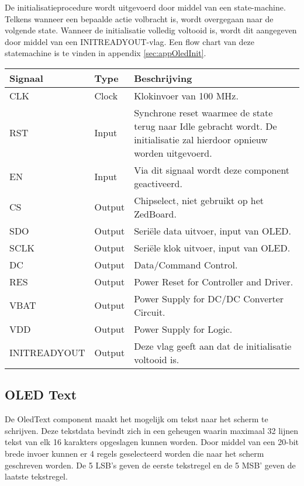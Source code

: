  		\par De initialisatieprocedure wordt uitgevoerd door middel van een state-machine. Telkens wanneer een bepaalde actie volbracht is, wordt overgegaan naar de volgende state. Wanneer de initialisatie volledig voltooid is, wordt dit aangegeven door middel van een INIT\textunderscore READY\textunderscore OUT-vlag.
 		Een flow chart van deze statemachine is te vinden in appendix \ref{sec:appOledInit}.

			\begin{table}[H]
				\begin{tabular}{p{} p{} p{}}
					\toprule
					\textbf{Signaal} & \textbf{Type} & \textbf{Beschrijving} \\
					\midrule
					CLK & Clock & Klokinvoer van 100 MHz. \\
					RST & Input & Synchrone reset waarmee de state terug naar Idle gebracht wordt. De initialisatie zal hierdoor opnieuw worden uitgevoerd. \\
					EN & Input & Via dit signaal wordt deze component geactiveerd. \\
					CS & Output & Chipselect, niet gebruikt op het ZedBoard. \\
					SDO & Output & Seri\"ele data uitvoer, input van OLED. \\
					SCLK & Output & Seri\"ele klok uitvoer, input van OLED. \\
					DC & Output & Data/Command Control. \\
					RES & Output & Power Reset for Controller and Driver. \\
					VBAT & Output & Power Supply for DC/DC Converter Circuit. \\
					VDD & Output & Power Supply for Logic. \\
					INIT\textunderscore READY\textunderscore OUT & Output & Deze vlag geeft aan dat de initialisatie voltooid is. \\
					\bottomrule 
				\end{tabular} 
			\end{table}

 	\subsection{OLED Text}

 		\par De OledText component maakt het mogelijk om tekst naar het scherm te schrijven. Deze tekstdata bevindt zich in een geheugen waarin maximaal 32 lijnen tekst van elk 16 karakters opgeslagen kunnen worden. Door middel van een 20-bit brede invoer kunnen er 4 regels geselecteerd worden die naar het scherm geschreven worden. De 5 LSB's geven de eerste tekstregel en de 5 MSB' geven de laatste tekstregel.

